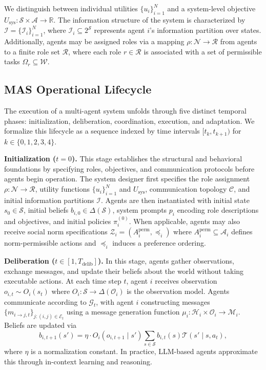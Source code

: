 \documentclass[11pt, letterpaper, shortlabels]{berkeley}
\begin{document}
We distinguish between individual utilities $\{u_i\}_{i=1}^N$ and a system-level objective $U_{\text{sys}}: \mathcal{S} \times \mathcal{A} \to \mathbb{R}$. The information structure of the system is characterized by $\mathcal{I} = \{\mathcal{I}_i\}_{i=1}^N$, where $\mathcal{I}_i \subseteq 2^\mathcal{S}$ represents agent $i$'s information partition over states. Additionally, agents may be assigned roles via a mapping $\rho: \mathcal{N} \to \mathcal{R}$ from agents to a finite role set $\mathcal{R}$, where each role $r \in \mathcal{R}$ is associated with a set of permissible tasks $\Omega_r \subseteq \mathcal{W}$.

\subsection{MAS Operational Lifecycle}
\label{subsec:lifecycle}

The execution of a multi-agent system unfolds through five distinct temporal phases: initialization, deliberation, coordination, execution, and adaptation. We formalize this lifecycle as a sequence indexed by time intervals $[t_k, t_{k+1})$ for $k \in \{0, 1, 2, 3, 4\}$.

\noindent\textbf{Initialization ($t = 0$).} 
This stage establishes the structural and behavioral foundations by specifying roles, objectives, and communication protocols before agents begin operation.
The system designer first specifies the role assignment $\rho: \mathcal{N} \to \mathcal{R}$, utility functions $\{u_i\}_{i=1}^N$ and $U_{\text{sys}}$, communication topology $\mathcal{C}$, and initial information partitions $\mathcal{I}$. Agents are then instantiated with initial state $s_0 \in \mathcal{S}$, initial beliefs $b_{i,0} \in \Delta(\mathcal{S})$, system prompts $p_i$ encoding role descriptions and objectives, and initial policies $\pi_i^{(0)}$. When applicable, agents may also receive social norm specifications $\mathcal{Z}_i = (A_i^{\text{perm}}, \preceq_i)$ where $A_i^{\text{perm}} \subseteq \mathcal{A}_i$ defines norm-permissible actions and $\preceq_i$ induces a preference ordering.

\noindent\textbf{Deliberation ($t \in [1, T_{\text{delib}}]$).} 
In this stage, agents gather observations, exchange messages, and update their beliefs about the world without taking executable actions.
At each time step $t$, agent $i$ receives observation $o_{i,t} \sim O_i(s_t)$ where $O_i: \mathcal{S} \to \Delta(\mathcal{O}_i)$ is the observation model. Agents communicate according to $\mathcal{G}_t$, with agent $i$ constructing messages $\{m_{i \to j,t}\}_{j: (i,j) \in \mathcal{E}_t}$ using a message generation function $\mu_i: \mathcal{H}_i \times \mathcal{O}_i \to \mathcal{M}_i$. Beliefs are updated via
\begin{equation}
b_{i,t+1}(s') = \eta \cdot O_i(o_{i,t+1} \mid s') \sum_{s \in \mathcal{S}} b_{i,t}(s) \mathcal{T}(s' \mid s, a_t),
\end{equation}
where $\eta$ is a normalization constant. In practice, LLM-based agents approximate this through in-context learning and reasoning.
\end{document}

